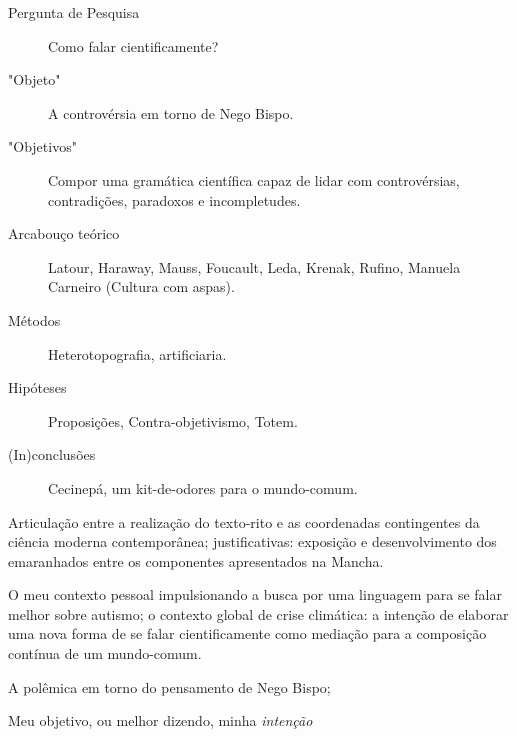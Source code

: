 {\small
\begin{description}
    \item[Pergunta de Pesquisa] Como falar cientificamente?
    \item["Objeto"] A controvérsia em torno de Nego Bispo.
    \item["Objetivos"] Compor uma gramática científica capaz de lidar com controvérsias, contradições, paradoxos e incompletudes.
    \item[Arcabouço teórico] Latour, Haraway, Mauss, Foucault, Leda, Krenak, Rufino, Manuela Carneiro (Cultura com aspas).
    \item[Métodos] Heterotopografia, artificiaria.
    \item[Hipóteses] Proposições, Contra-objetivismo, Totem.
    \item[(In)conclusões] Cecinepá, um kit-de-odores para o mundo-comum.
\end{description}}


Articulação entre a realização do texto-rito e as coordenadas contingentes da ciência moderna contemporânea;
    justificativas:
        exposição e desenvolvimento dos emaranhados entre os componentes apresentados na Mancha.

O meu contexto pessoal impulsionando a busca por uma linguagem para se falar melhor sobre autismo;
    o contexto global de crise climática:
        a intenção de elaborar uma nova forma de se falar cientificamente como mediação para a composição contínua de um mundo-comum.

A polêmica em torno do pensamento de Nego Bispo;

Meu objetivo, ou melhor dizendo, minha \textit{intenção} 

